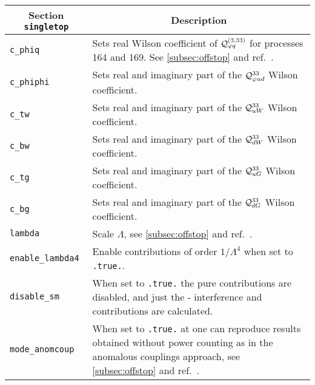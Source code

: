 	\begin{longtable}{p{1.5cm}p{12cm}}
		\toprule
		\multicolumn{1}{c}{{\textbf{Section} \texttt{singletop}}} & \multicolumn{1}{c}{{\textbf{Description}}} \\ 
		\midrule
		\texttt{c\_phiq} & Sets real Wilson coefficient of $\mathcal{Q}_{\varphi q}^{(3,33)}$ for processes 164 and 169. See \cref{subsec:offstop} 
		and ref.~\cite{Neumann:2019kvk}. \\
		\texttt{c\_phiphi} & Sets real and imaginary part of the $\mathcal{Q}_{\varphi u d }^{33}$ Wilson coefficient. \\
		\texttt{c\_tw} & Sets real and imaginary part of the $\mathcal{Q}_{uW}^{33}$ Wilson coefficient. \\
		\texttt{c\_bw} & Sets real and imaginary part of the $\mathcal{Q}_{dW}^{33}$ Wilson coefficient. \\
		\texttt{c\_tg} & Sets real and imaginary part of the $\mathcal{Q}_{uG}^{33} $ Wilson coefficient. \\
		\texttt{c\_bg} & Sets real and imaginary part of the $\mathcal{Q}_{dG}^{33}$ Wilson coefficient. \\
		\texttt{lambda} & Scale $\Lambda$, see \cref{subsec:offstop} and ref.~\cite{Neumann:2019kvk}. \\
		\texttt{enable\_lambda4} & Enable contributions of order $1/\Lambda^4$ when set to \texttt{.true.}. \\
		\texttt{disable\_sm} & When set to \texttt{.true.} the pure \SM{} contributions are disabled, and just
		the \SM{}-\EFT{} interference and \EFT{} contributions are calculated. \\
		\texttt{mode\_anomcoup} & When set to \texttt{.true.} at \LO{} one can reproduce results obtained
			without power counting as in the anomalous couplings approach, see \cref{subsec:offstop} and 
			ref.~\cite{Neumann:2019kvk}. \\
		\bottomrule
	\end{longtable}

